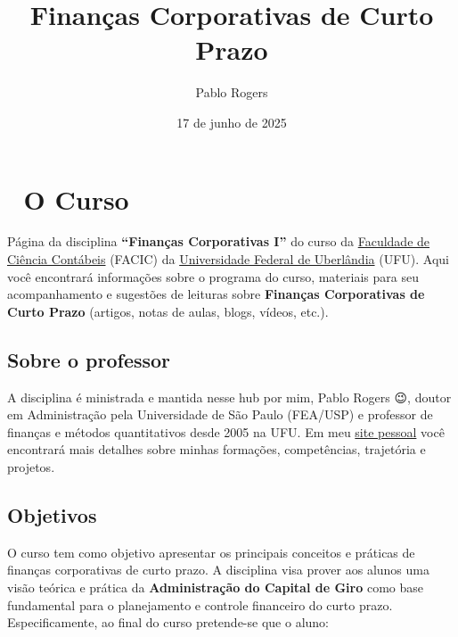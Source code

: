 \documentclass[
  a4paper,
]{book}
\title{Finanças Corporativas de Curto Prazo}
\author{Pablo Rogers}
\date{17 de junho de 2025}
\renewcommand*\contentsname{Índice}
\newcommand\contentsname{Índice}
\begin{document}
\frontmatter
\maketitle

\renewcommand*\contentsname{Índice}
{
\hypersetup{linkcolor=}
\setcounter{tocdepth}{2}
\tableofcontents
}
\mainmatter
{}

\chapter*{🏢 O Curso}\label{sec-home}


Página da disciplina \textbf{``Finanças Corporativas I''} do curso da
\href{https://www.facic.ufu.br/}{Faculdade de Ciência Contábeis} (FACIC)
da \href{https://ufu.br/}{Universidade Federal de Uberlândia} (UFU).
Aqui você encontrará informações sobre o programa do curso, materiais
para seu acompanhamento e sugestões de leituras sobre \textbf{Finanças
Corporativas de Curto Prazo} (artigos, notas de aulas, blogs, vídeos,
etc.).

\section*{Sobre o professor}\label{sec-instrutor}


A disciplina é ministrada e mantida nesse hub por mim, Pablo Rogers 😉,
doutor em Administração pela Universidade de São Paulo (FEA/USP) e
professor de finanças e métodos quantitativos desde 2005 na UFU. Em meu
\href{https://phdpablo.com/}{site pessoal} você encontrará mais detalhes
sobre minhas formações, competências, trajetória e projetos.

\section*{Objetivos}\label{sec-about}


O curso tem como objetivo apresentar os principais conceitos e práticas
de finanças corporativas de curto prazo. A disciplina visa prover aos
alunos uma visão teórica e prática da \textbf{Administração do Capital
de Giro} como base fundamental para o planejamento e controle financeiro
do curto prazo. Especificamente, ao final do curso pretende-se que o
aluno:
\end{document}

